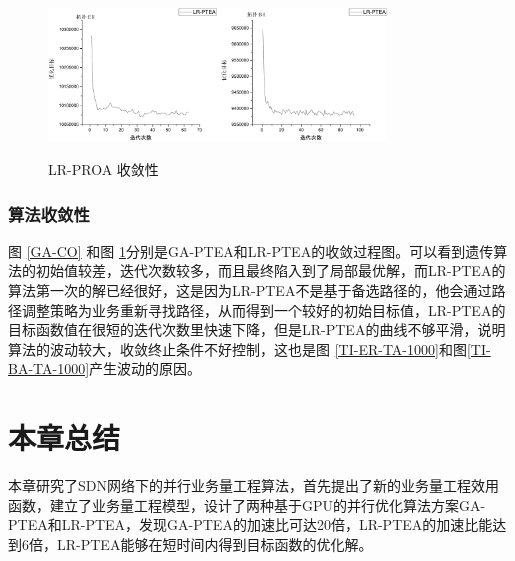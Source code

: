 \begin{figure}
\setlength{\abovecaptionskip}{-0.5cm}
\begin{center}
{\includegraphics[width=0.8\textwidth]{figures/LR-CO.pdf}}
\end{center}
\caption{{\footnotesize{LR-PROA 收敛性}}}
\label{LR-CO}
\end{figure}
\subsubsection{算法收敛性}
图 \ref{GA-CO} 和图 \ref{LR-CO}分别是GA-PTEA和LR-PTEA的收敛过程图。可以看到遗传算法的初始值较差，迭代次数较多，而且最终陷入到了局部最优解，而LR-PTEA的算法第一次的解已经很好，这是因为LR-PTEA不是基于备选路径的，他会通过路径调整策略为业务重新寻找路径，从而得到一个较好的初始目标值，LR-PTEA的目标函数值在很短的迭代次数里快速下降，但是LR-PTEA的曲线不够平滑，说明算法的波动较大，收敛终止条件不好控制，这也是图 \ref{TI-ER-TA-1000}和图\ref{TI-BA-TA-1000}产生波动的原因。

\section{本章总结}
本章研究了SDN网络下的并行业务量工程算法，首先提出了新的业务量工程效用函数，建立了业务量工程模型，设计了两种基于GPU的并行优化算法方案GA-PTEA和LR-PTEA，发现GA-PTEA的加速比可达20倍，LR-PTEA的加速比能达到6倍，LR-PTEA能够在短时间内得到目标函数的优化解。








